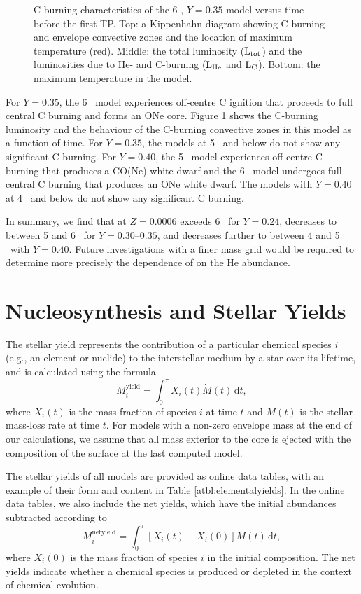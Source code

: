 \begin{figure}
 \caption{C-burning characteristics of the 6 \Msun, $Y=0.35$ model versus time before the first TP. Top: a Kippenhahn diagram showing C-burning and envelope convective zones and the location of maximum temperature (red). Middle: the total luminosity ($\mathrm{L}_\mathrm{tot}$) and the luminosities due to He- and C-burning ($\mathrm{L}_\mathrm{He}$ and $\mathrm{L}_\mathrm{C}$). Bottom: the maximum temperature in the model.}\label{fig:cburning}
\end{figure}

For $Y=0.35$, the 6 \Msun\ model experiences off-centre C ignition that proceeds to full central C burning and forms an ONe core. Figure \ref{fig:cburning} shows the C-burning luminosity and the behaviour of the C-burning convective zones in this model as a function of time. For $Y=0.35$, the models at 5 \Msun\ and below do not show any significant C burning. For $Y=0.40$, the 5 \Msun\ model experiences off-centre C burning that produces a CO(Ne) white dwarf and the 6 \Msun\ model undergoes full central C burning that produces an ONe white dwarf. The models with $Y=0.40$ at 4 \Msun\ and below do not show any significant C burning.

In summary, we find that  at $Z=0.0006$ exceeds 6 \Msun\ for $Y=0.24$, decreases to between 5 and 6 \Msun\ for $Y=0.30$--$0.35$, and decreases further to between 4 and 5 \Msun\ with $Y=0.40$. Future investigations with a finer mass grid would be required to determine more precisely the dependence of  on the He abundance.

\section{Nucleosynthesis and Stellar Yields}\label{sec:nucleosynthesisyields}
The stellar yield represents the contribution of a particular chemical species $i$ (e.g., an element or nuclide) to the interstellar medium by a star over its lifetime, and is calculated using the formula
\begin{equation}
 M_{i}^\mathrm{yield} = \int_{0}^{\tau} X_i(t) \dot{M}(t) \,\mathrm{d}t,
\end{equation}
where $X_i(t)$ is the mass fraction of species $i$ at time $t$ and $\dot{M}(t)$ is the stellar mass-loss rate at time $t$. For models with a non-zero envelope mass at the end of our calculations, we assume that all mass exterior to the core is ejected with the composition of the surface at the last computed model.

The stellar yields of all models are provided as online data tables, with an example of their form and content in Table \ref{atbl:elementalyields}. In the online data tables, we also include the net yields, which have the initial abundances subtracted according to
\begin{equation}
 M_{i}^\mathrm{netyield} = \int_{0}^{\tau} \left[ X_i(t) - X_i(0) \right] \dot{M}(t) \,\mathrm{d}t,
\end{equation}
where $X_i(0)$ is the mass fraction of species $i$ in the initial composition. The net yields indicate whether a chemical species is produced or depleted in the context of chemical evolution.

